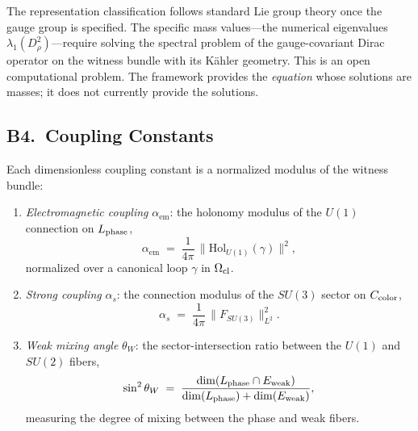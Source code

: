 \begin{remark}
\label{rem:mass-boundary}
The representation classification follows standard Lie group theory once the
gauge group is specified.  The specific mass values---the numerical
eigenvalues $\lambda_1(D_\rho^2)$---require solving the spectral problem of
the gauge-covariant Dirac operator on the witness bundle with its
K\"{a}hler geometry.  This is an open computational problem.  The framework
provides the \emph{equation} whose solutions are masses; it does not
currently provide the solutions.
\end{remark}

\subsection{B4.\ Coupling Constants}
\label{sec:physics:couplings}

\begin{definition}
\label{def:couplings}
Each dimensionless coupling constant is a normalized modulus of the witness
bundle:
\begin{enumerate}[nosep, label=\textnormal{(\alph*)}]
  \item \emph{Electromagnetic coupling} $\alpha_{\mathrm{em}}$: the holonomy
        modulus of the $U(1)$ connection on $L_{\mathrm{phase}}$,
        \[
          \alpha_{\mathrm{em}} \;=\; \frac{1}{4\pi}\,
          \bigl\|\mathrm{Hol}_{U(1)}(\gamma)\bigr\|^2,
        \]
        normalized over a canonical loop $\gamma$ in $\Omega_{\mathrm{cl}}$.
  \item \emph{Strong coupling} $\alpha_s$: the connection modulus of the
        $SU(3)$ sector on $C_{\mathrm{color}}$,
        \[
          \alpha_s \;=\; \frac{1}{4\pi}\,
          \bigl\|F_{SU(3)}\bigr\|^2_{L^2}.
        \]
  \item \emph{Weak mixing angle} $\theta_W$: the sector-intersection ratio
        between the $U(1)$ and $SU(2)$ fibers,
        \[
          \sin^2\theta_W \;=\; \frac{\dim(\Lphase \cap \Eweak)}%
          {\dim(\Lphase) + \dim(\Eweak)},
        \]
        measuring the degree of mixing between the phase and weak fibers.
\end{enumerate}
\end{definition}

